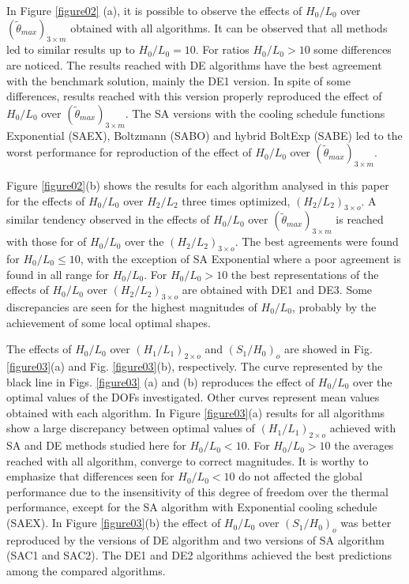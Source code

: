 \documentclass[12pt,fleqn]{article}
\begin{document}
In Figure \ref{figure02} (a), it is possible to observe the effects of $H_{0}/L_{0}$ over $(\tilde{\theta}_{max})_{3\times m}$ obtained with all algorithms. It can be observed that all methods led to similar results up to $H_{0}/L_{0}=10$. For ratios $H_{0}/L_{0}>10$ some differences are noticed. The results reached with DE algorithms have the best agreement with the benchmark solution, mainly the DE1 version. In spite of some differences, results reached with this version properly reproduced the effect of $H_{0}/L_{0}$ over $(\tilde{\theta}_{max})_{3\times m}$. The SA versions with the cooling schedule functions Exponential (SAEX), Boltzmann (SABO) and hybrid BoltExp (SABE) led to the worst performance for reproduction of the effect of  $H_{0}/L_{0}$ over $(\tilde{\theta}_{max})_{3\times m}$.

Figure \ref{figure02}(b) shows the results for each algorithm analysed in this paper for the effects of  $H_{0}/L_{0}$ over $H_{2}/L_{2}$ three times optimized, $(H_{2}/L_{2})_{3\times o}$. A similar tendency observed in the effects of $H_{0}/L_{0}$ over $(\tilde{\theta}_{max})_{3\times m}$ is reached with those for of $H_{0}/L_{0}$ over the $(H_{2}/L_{2})_{3\times o}$. The best agreements were found for $H_{0}/L_{0}\leqslant10$, with the exception of SA Exponential where a poor agreement is found in all range for $H_{0}/L_{0}$. For $H_{0}/L_{0}>10$ the best representations of the effects of $H_{0}/L_{0}$ over $(H_{2}/L_{2})_{3\times o}$ are obtained with DE1 and DE3. Some discrepancies are seen for the highest magnitudes of $H_{0}/L_{0}$, probably by the achievement of some local optimal shapes.

The effects of $H_{0}/L_{0}$ over $(H_{1}/L_{1})_{2\times o}$ and $(S_{1}/H_{0})_{o}$ are showed in Fig. \ref{figure03}(a) and Fig. \ref{figure03}(b), respectively. The curve represented by the black line in Figs. \ref{figure03} (a) and (b) reproduces the effect of $H_{0}/L_{0}$ over the optimal values of the DOFs investigated. Other curves represent mean values obtained with each algorithm. In Figure \ref{figure03}(a) results for all algorithms show a large discrepancy between optimal values of $(H_{1}/L_{1})_{2\times o}$ achieved with SA and DE methods studied here for $H_{0}/L_{0}<10$. For $H_{0}/L_{0}>10$ the averages reached with all algorithm, converge to correct magnitudes. It is worthy to emphasize that differences seen for $H_{0}/L_{0}<10$ do not affected the global performance due to the insensitivity of this degree of freedom over the thermal performance, except for the SA algorithm with Exponential cooling schedule (SAEX). In Figure \ref{figure03}(b) the effect of $H_{0}/L_{0}$ over $(S_{1}/H_{0})_{o}$ was better reproduced by the versions of DE algorithm and two versions of SA algorithm (SAC1 and SAC2). The DE1 and DE2 algorithms achieved the best predictions among the compared algorithms.
\end{document}
